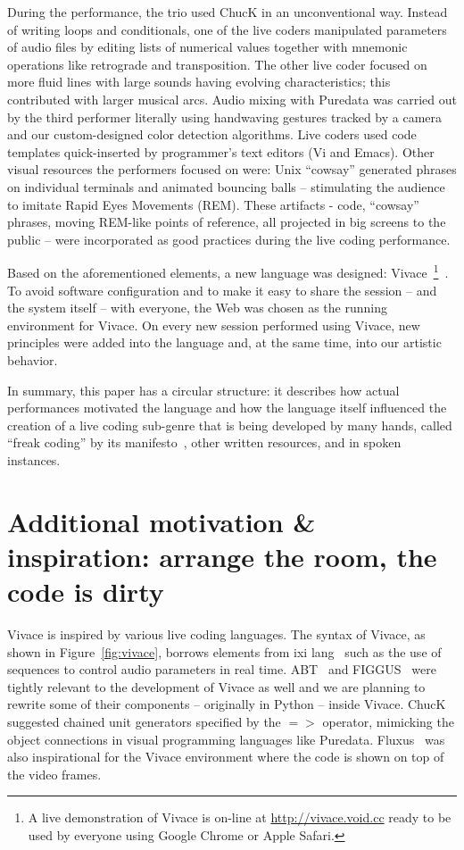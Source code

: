 \documentclass[letterpaper, 12pt]{article}
\begin{document}
During the performance, the trio used ChucK in an unconventional
way. Instead of writing loops and conditionals, one of the live coders
manipulated parameters of audio files by editing lists of numerical
values together with mnemonic operations like retrograde and
transposition.  The other live coder focused on more fluid lines with
large sounds having evolving characteristics; this contributed with
larger musical arcs.  Audio mixing with Puredata was carried out by
the third performer literally using handwaving gestures tracked by a
camera and our custom-designed color detection algorithms. Live coders
used code templates quick-inserted by programmer's text editors (Vi
and Emacs). Other visual resources the performers focused on were:
Unix ``cowsay'' generated phrases on individual terminals and animated
bouncing balls -- stimulating the audience to imitate Rapid Eyes
Movements (REM). These artifacts - code, ``cowsay'' phrases, moving
REM-like points of reference, all projected in big screens to the
public -- were incorporated as good practices during the live coding
performance.

Based on the aforementioned elements, a new language was designed:
Vivace~\footnote{A live demonstration of Vivace is on-line at
  \url{http://vivace.void.cc} ready to be used by everyone using
  Google Chrome or Apple Safari.}~\citep*{Vivace}.  To avoid software
configuration and to make it easy to share the session -- and the
system itself -- with everyone, the Web was chosen as the running
environment for Vivace. On every new session performed using Vivace,
new principles were added into the language and, at the same time,
into our artistic behavior.

In summary, this paper has a circular structure: it describes how
actual performances motivated the language and how the language itself
influenced the creation of a live coding sub-genre that is being
developed by many hands, called ``freak coding'' by its
manifesto~\citep*{freak}, other written resources, and in spoken
instances.

\parskip 18pt

\section{Additional motivation \& inspiration: arrange the room, the code is dirty}

Vivace is inspired by various live coding languages. The syntax of
Vivace, as shown in Figure~\ref{fig:vivace}, borrows elements from ixi
lang~\citep{magnusson2011ixi} such as the use of sequences to control
audio parameters in real time. ABT~\citep{fabbri} and
FIGGUS~\citep{fabbri2} were tightly relevant to the development of
Vivace as well and we are planning to rewrite some of their components
-- originally in Python -- inside Vivace. ChucK suggested chained unit
generators specified by the $=>$ operator, mimicking the object
connections in visual programming languages like
Puredata. Fluxus~\citep{fluxus} was also inspirational for the Vivace
environment where the code is shown on top of the video frames.
\end{document}
